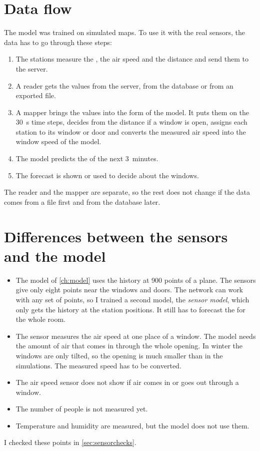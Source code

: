 \section{Data flow}
The model was trained on simulated \cotwo{} maps. To use it with the real sensors, the data has to go through
these steps:
\begin{enumerate}
  \item The stations measure the \cotwo{}, the air speed and the distance and send them to the server.
  \item A reader gets the values from the server, from the database or from an exported file.
  \item A mapper brings the values into the form of the model. It puts them on the 30~s time steps, decides
        from the distance if a window is open, assigns each station to its window or door and converts the
        measured air speed into the window speed of the model.
  \item The model predicts the \cotwo{} of the next 3~minutes.
  \item The forecast is shown or used to decide about the windows.
\end{enumerate}
The reader and the mapper are separate, so the rest does not change if the data comes from a file first and
from the database later.

\section{Differences between the sensors and the model}
\begin{itemize}
  \item The model of \cref{ch:model} uses the \cotwo{} history at 900 points of a plane. The sensors give only
        eight points near the windows and doors. The network can work with any set of points, so I trained a
        second model, the \emph{sensor model}, which only gets the history at the station positions. It still
        has to forecast the \cotwo{} for the whole room.
  \item The sensor measures the air speed at one place of a window. The model needs the amount of air that
        comes in through the whole opening. In winter the windows are only tilted, so the opening is much
        smaller than in the simulations. The measured speed has to be converted.
  \item The air speed sensor does not show if air comes in or goes out through a window.
  \item The number of people is not measured yet.
  \item Temperature and humidity are measured, but the model does not use them.
\end{itemize}
I checked these points in \cref{sec:sensorchecks}.

